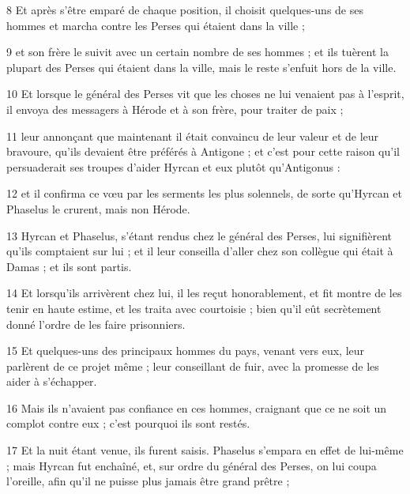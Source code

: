 \par 8 Et après s'être emparé de chaque position, il choisit quelques-uns de ses hommes et marcha contre les Perses qui étaient dans la ville ;

\par 9 et son frère le suivit avec un certain nombre de ses hommes ; et ils tuèrent la plupart des Perses qui étaient dans la ville, mais le reste s'enfuit hors de la ville.

\par 10 Et lorsque le général des Perses vit que les choses ne lui venaient pas à l'esprit, il envoya des messagers à Hérode et à son frère, pour traiter de paix ;

\par 11 leur annonçant que maintenant il était convaincu de leur valeur et de leur bravoure, qu'ils devaient être préférés à Antigone ; et c'est pour cette raison qu'il persuaderait ses troupes d'aider Hyrcan et eux plutôt qu'Antigonus :

\par 12 et il confirma ce vœu par les serments les plus solennels, de sorte qu'Hyrcan et Phaselus le crurent, mais non Hérode.

\par 13 Hyrcan et Phaselus, s'étant rendus chez le général des Perses, lui signifièrent qu'ils comptaient sur lui ; et il leur conseilla d'aller chez son collègue qui était à Damas ; et ils sont partis.

\par 14 Et lorsqu'ils arrivèrent chez lui, il les reçut honorablement, et fit montre de les tenir en haute estime, et les traita avec courtoisie ; bien qu'il eût secrètement donné l'ordre de les faire prisonniers.

\par 15 Et quelques-uns des principaux hommes du pays, venant vers eux, leur parlèrent de ce projet même ; leur conseillant de fuir, avec la promesse de les aider à s'échapper.

\par 16 Mais ils n'avaient pas confiance en ces hommes, craignant que ce ne soit un complot contre eux ; c'est pourquoi ils sont restés.

\par 17 Et la nuit étant venue, ils furent saisis. Phaselus s'empara en effet de lui-même ; mais Hyrcan fut enchaîné, et, sur ordre du général des Perses, on lui coupa l'oreille, afin qu'il ne puisse plus jamais être grand prêtre ;

